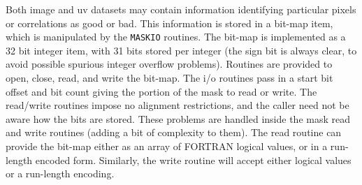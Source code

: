 
Both image and uv datasets may contain information identifying
particular pixels or correlations as good or bad. This information is
stored in a bit-map item, which is manipulated by the {\tt MASKIO} routines.
The bit-map is implemented as a 32 bit integer item, with 31 bits stored per
integer (the sign bit is always clear, to avoid possible spurious integer
overflow problems). Routines are provided to open, close, read, and write the
bit-map. The i/o routines pass in a start bit offset and bit
count giving the portion of the mask to read or write. The read/write routines
impose no alignment restrictions, and the caller need not be aware how the
bits are stored. These problems are handled inside the mask read and write
routines (adding a bit of complexity to them).  The read routine can provide
the bit-map either as an array of FORTRAN logical values, or in a run-length
encoded form.  Similarly, the write routine will accept either logical values
or a run-length encoding.


